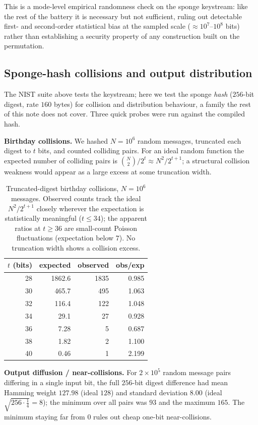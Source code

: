 \documentclass[11pt]{article}
\begin{document}
This is a mode-level empirical randomness check on the sponge keystream: like the
rest of the battery it is necessary but not sufficient, ruling out detectable
first- and second-order statistical bias at the sampled scale
($\approx10^{7}$--$10^{8}$ bits) rather than establishing a security property of
any construction built on the permutation.

\subsection{Sponge-hash collisions and output distribution}
The NIST suite above tests the keystream; here we test the sponge \emph{hash}
($256$-bit digest, rate $160$ bytes) for collision and distribution behaviour, a
family the rest of this note does not cover. Three quick probes were run against
the compiled hash.

\textbf{Birthday collisions.} We hashed $N=10^{6}$ random messages, truncated
each digest to $t$ bits, and counted colliding pairs. For an ideal random
function the expected number of colliding pairs is
$\binom{N}{2}/2^{t}\approx N^{2}/2^{t+1}$; a structural collision weakness would
appear as a large excess at some truncation width.

\begin{table}[h]
\centering
\begin{tabular}{rrrr}
  \toprule
  \textbf{$t$ (bits)} & \textbf{expected} & \textbf{observed} & \textbf{obs/exp} \\
  \midrule
  28 & 1862.6 & 1835 & 0.985 \\
  30 &  465.7 &  495 & 1.063 \\
  32 &  116.4 &  122 & 1.048 \\
  34 &   29.1 &   27 & 0.928 \\
  36 &    7.28 &    5 & 0.687 \\
  38 &    1.82 &    2 & 1.100 \\
  40 &    0.46 &    1 & 2.199 \\
  \bottomrule
\end{tabular}
\caption{Truncated-digest birthday collisions, $N=10^{6}$ messages. Observed
counts track the ideal $N^{2}/2^{t+1}$ closely wherever the expectation is
statistically meaningful ($t\le34$); the apparent ratios at $t\ge36$ are
small-count Poisson fluctuations (expectation below $7$). No truncation width
shows a collision excess.}
\end{table}

\textbf{Output diffusion / near-collisions.} For $2\times10^{5}$ random message
pairs differing in a single input bit, the full $256$-bit digest difference had
mean Hamming weight $127.98$ (ideal $128$) and standard deviation $8.00$ (ideal
$\sqrt{256\cdot\tfrac14}=8$); the minimum over all pairs was $93$ and the maximum
$165$. The minimum staying far from $0$ rules out cheap one-bit near-collisions.
\end{document}
